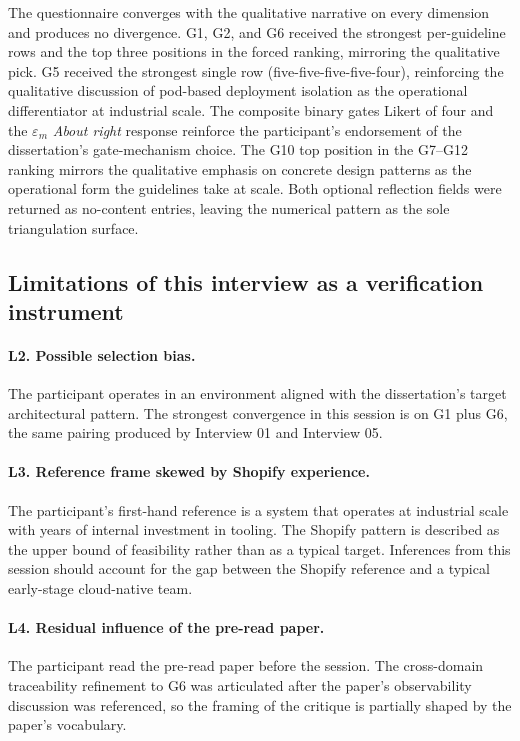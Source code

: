 The questionnaire converges with the qualitative narrative on every dimension and produces no divergence. G1, G2, and G6 received the strongest per-guideline rows and the top three positions in the forced ranking, mirroring the qualitative pick. G5 received the strongest single row (five-five-five-five-four), reinforcing the qualitative discussion of pod-based deployment isolation as the operational differentiator at industrial scale. The composite binary gates Likert of four and the $\varepsilon_m$ \emph{About right} response reinforce the participant's endorsement of the dissertation's gate-mechanism choice. The G10 top position in the G7--G12 ranking mirrors the qualitative emphasis on concrete design patterns as the operational form the guidelines take at scale. Both optional reflection fields were returned as no-content entries, leaving the numerical pattern as the sole triangulation surface.

\subsection*{Limitations of this interview as a verification instrument}

\paragraph*{L2. Possible selection bias.} The participant operates in an environment aligned with the dissertation's target architectural pattern. The strongest convergence in this session is on G1 plus G6, the same pairing produced by Interview 01 and Interview 05.

\paragraph*{L3. Reference frame skewed by Shopify experience.} The participant's first-hand reference is a system that operates at industrial scale with years of internal investment in tooling. The Shopify pattern is described as the upper bound of feasibility rather than as a typical target. Inferences from this session should account for the gap between the Shopify reference and a typical early-stage cloud-native team.

\paragraph*{L4. Residual influence of the pre-read paper.} The participant read the pre-read paper before the session. The cross-domain traceability refinement to G6 was articulated after the paper's observability discussion was referenced, so the framing of the critique is partially shaped by the paper's vocabulary.

